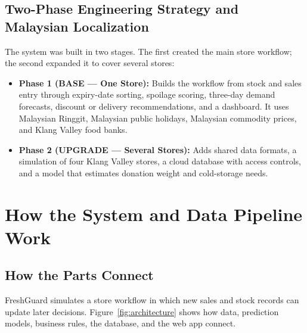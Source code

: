 \documentclass[12pt,a4paper]{article}
\renewcommand{\_}{\oldunderscore\allowbreak}
\begin{document}
\subsection{Two-Phase Engineering Strategy and Malaysian Localization}
The system was built in two stages. The first created the main store workflow; the second expanded it to cover several stores:
\begin{itemize}[leftmargin=18pt, itemsep=2pt]
    \item \textbf{Phase 1 (BASE --- One Store):} Builds the workflow from stock and sales entry through expiry-date sorting, spoilage scoring, three-day demand forecasts, discount or delivery recommendations, and a dashboard. It uses Malaysian Ringgit, Malaysian public holidays, Malaysian commodity prices, and Klang Valley food banks.
    \item \textbf{Phase 2 (UPGRADE --- Several Stores):} Adds shared data formats, a simulation of four Klang Valley stores, a cloud database with access controls, and a model that estimates donation weight and cold-storage needs.
\end{itemize}

\section{How the System and Data Pipeline Work}

\subsection{How the Parts Connect}
FreshGuard simulates a store workflow in which new sales and stock records can update later decisions. Figure~\ref{fig:architecture} shows how data, prediction models, business rules, the database, and the web app connect.
\end{document}
